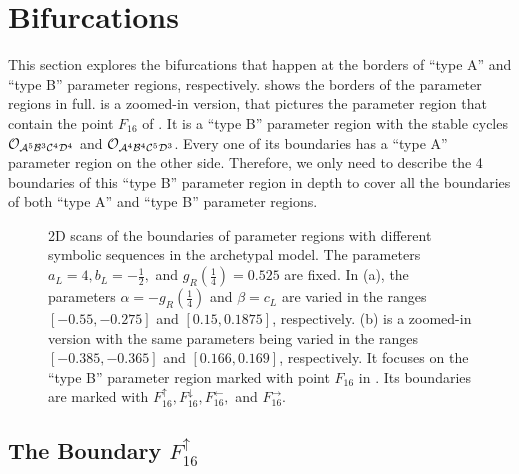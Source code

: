 \section{Bifurcations}
\label{sec:arch.bif}

This section explores the bifurcations that happen at the borders of ``type A'' and ``type B'' parameter regions, respectively.
 shows the borders of the parameter regions in full.
 is a zoomed-in version, that pictures the parameter region that contain the point $F_{16}$ of .
It is a ``type B'' parameter region with the stable cycles $\mathcal{O}_{\mathcal{A}^5\mathcal{B}^3\mathcal{C}^4\mathcal{D}^4}$ and $\mathcal{O}_{\mathcal{A}^4\mathcal{B}^4\mathcal{C}^5\mathcal{D}^3}$.
Every one of its boundaries has a ``type A'' parameter region on the other side.
Therefore, we only need to describe the 4 boundaries of this ``type B'' parameter region in depth to cover all the boundaries of both ``type A'' and ``type B'' parameter regions.

\begin{figure}
	\centering
	\caption[2D scans of the boundaries of parameter regions with different symbolic sequences in the archetypal model]{
		2D scans of the boundaries of parameter regions with different symbolic sequences in the archetypal model.
		The parameters $a_L = 4, b_L = -\frac{1}{2},$ and $g_R\left(\frac{1}{4}\right) = 0.525$ are fixed.
		In (a), the parameters $\alpha = -g_R\left(\frac{1}{4}\right)$ and $\beta = c_L$ are varied in the ranges $[-0.55, -0.275]$ and $[0.15, 0.1875]$, respectively.
		(b) is a zoomed-in version with the same parameters being varied in the ranges $[-0.385, -0.365]$ and $[0.166, 0.169]$, respectively.
		It focuses on the ``type B'' parameter region marked with point $F_{16}$ in .
		Its boundaries are marked with $F_{16}^\uparrow, F_{16}^\downarrow, F_{16}^\leftarrow,$ and $F_{16}^\rightarrow$.
	}
	\label{fig:arch.dyn.regions}
\end{figure}

\subsection{The Boundary $F_{16}^\uparrow$}
\label{sec:arch.bif.U}

